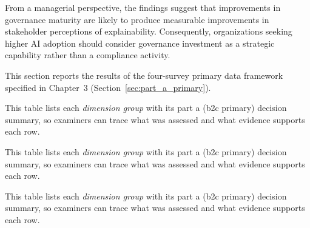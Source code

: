 \noindent From a managerial perspective, the findings suggest that improvements in governance maturity are likely to produce measurable improvements in stakeholder perceptions of explainability. Consequently, organizations seeking higher AI adoption should consider governance investment as a strategic capability rather than a compliance activity.


\label{sec:ch4_part_a}

This section reports the results of the four-survey primary data framework specified in Chapter~3 (Section~\ref{sec:part_a_primary}).

\noindent This table lists each \textit{dimension group} with its part a (b2c primary) decision summary, so examiners can trace what was assessed and what evidence supports each row.



\noindent This table lists each \textit{dimension group} with its part a (b2c primary) decision summary, so examiners can trace what was assessed and what evidence supports each row.


\noindent This table lists each \textit{dimension group} with its part a (b2c primary) decision summary, so examiners can trace what was assessed and what evidence supports each row.



